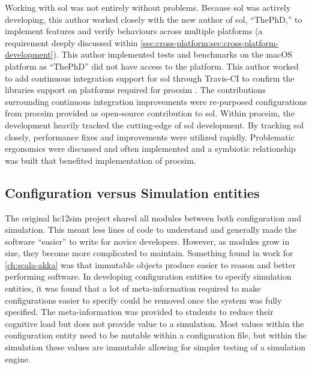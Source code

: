 Working with sol was not entirely without problems. Because sol was actively developing, this author worked closely with the new author of sol, ``ThePhD,'' to implement features and verify behaviours across multiple platforms (a requirement deeply discussed within \cref{sec:cross-platform:sec:cross-platform-development}). This author implemented tests and benchmarks on the macOS platform as ``ThePhD'' did not have access to the platform. This author worked to add continuous integration support for sol through Travis-CI \cite{TravisCI} to confirm the libraries support on platforms required for procsim \cite{Github:ThePhD:sol2:pr:17, Github:ThePhD:sol2:pr:18}. The contributions surrounding continuous integration improvements were re-purposed configurations from procsim provided as open-source contribution to sol. Within procsim, the development heavily tracked the cutting-edge of sol development. By tracking sol closely, performance fixes and improvements were utilized rapidly. Problematic ergonomics were discussed and often implemented and a symbiotic relationship was built that benefited implementation of procsim. 

\subsection{Configuration versus Simulation entities}

The original hc12sim project shared all modules between both configuration and simulation. This meant less lines of code to understand and generally made the software ``easier'' to write for novice developers. However, as modules grow in size, they become more complicated to maintain. Something found in work for \cref{ch:scala-akka} was that immutable objects produce easier to reason and better performing software. In developing configuration entities to specify simulation entities, it was found that a lot of meta-information required to make configurations easier to specify could be removed once the system was fully specified. The meta-information was provided to students to reduce their cognitive load but does not provide value to a simulation. Most values within the configuration entity need to be mutable within a configuration file, but within the simulation these values are immutable allowing for simpler testing of a simulation engine.

